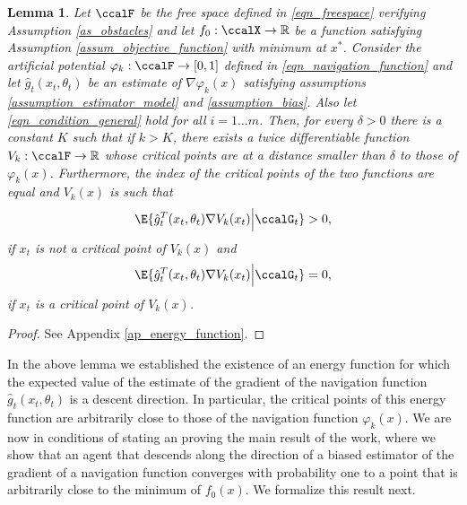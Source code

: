 \documentclass[article]{IEEEtran}
\newtheorem{lemma}{Lemma}
\theoremstyle{definition}
\begin{document}
%
\begin{lemma}\label{lemma_energy_function}
Let $\ccalF$ be the free space defined in \eqref{eqn_freespace} verifying Assumption \ref{as_obstacles} and let $f_0:\ccalX \to \mathbb{R}$ be a function satisfying Assumption \ref{assum_objective_function} with minimum at $x^*$. Consider the artificial potential $\varphi_k:\ccalF\to[0,1]$ defined in \eqref{eqn_navigation_function} and let $\hat{g}_t(x_t,\theta_t)$ be an estimate of $\nabla \varphi_k(x)$ satisfying assumptions \ref{assumption_estimator_model} and \ref{assumption_bias}. Also let \eqref{eqn_condition_general} hold for all $i=1\ldots m$. Then, for every $\delta>0$ there is a constant $K$ such that if $k>K$, there exists a twice differentiable function $V_k: \ccalF \to \mathbb{R}$ whose critical points are at a distance smaller than $\delta$ to those of $\varphi_k(x)$. Furthermore, the index of the critical points of the two functions are equal and $V_k(x)$ is such that
%
\begin{equation}\label{lemma_energy_function_eqn1}
\E{\hat{g}_t^T(x_t,\theta_t)\nabla V_k(x_t)\Big| \ccalG_t} > 0,
\end{equation}
%
if $x_t$ is not a critical point of $V_k(x)$ and
%
\begin{equation}\label{lemma_energy_function_eqn2}
\E{\hat{g}_t^T(x_t,\theta_t)\nabla V_k(x_t)\Big| \ccalG_t} = 0,
\end{equation}
%
if $x_t$ is a critical point of $V_k(x)$. 
\end{lemma}
%
\begin{proof}
See Appendix \ref{ap_energy_function}. 
\end{proof}
%
%
In the above lemma we established the existence of an energy function for which the expected value of the estimate of the gradient of the navigation function  $\hat{g}_t(x_t,\theta_t)$ is a descent direction. In particular, the critical points of this energy function are arbitrarily close to those of the navigation function $\varphi_k(x)$. We are now in conditions of stating an proving the main result of the work, where we show that an agent that descends along the direction of a biased estimator of the gradient of a navigation function converges with probability one to a point that is arbitrarily close to the minimum of $f_0(x)$. We formalize this result next. 
\end{document}
